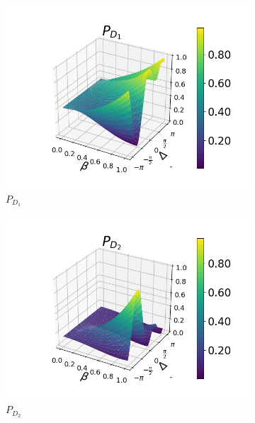 \documentclass[12pt]{book}
\begin{document}
\begin{figure}[t!]
\centering
\begin{subfigure}[b]{0.3\linewidth}
\includegraphics[width=\linewidth]{images/pd1_3.png}
\caption{$P_{D_{1}}$}
\end{subfigure}
\begin{subfigure}[b]{0.3\linewidth}
\includegraphics[width=\linewidth]{images/pd2_3.png}
\caption{$P_{D_{2}}$ }
\label{fig:BS1}
\end{subfigure}
\begin{subfigure}[b]{0.3\linewidth}

\end{subfigure}
\end{figure}
\end{document}
